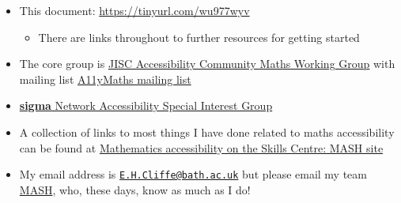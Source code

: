 \documentclass[
  10pt,
  a4paper]{article}
\providecommand{\tightlist}{%
  \setlength{\itemsep}{0pt}\setlength{\parskip}{0pt}}
\theoremstyle{plain}
\theoremstyle{plain}
\theoremstyle{plain}
\theoremstyle{plain}
\theoremstyle{plain}
\theoremstyle{definition}
\theoremstyle{definition}
\theoremstyle{definition}
\theoremstyle{remark}
\begin{document}
\begin{itemize}
\tightlist
\item
  This document: \url{https://tinyurl.com/wu977wyv}

  \begin{itemize}
  \tightlist
  \item
    There are links throughout to further resources for getting started
  \end{itemize}
\item
  The core group is \href{https://github.com/A11yMaths}{JISC Accessibility Community Maths Working Group} with mailing list \href{https://www.jiscmail.ac.uk/cgi-bin/webadmin?A0=ACCESSIBLE-MATHS}{A11yMaths mailing list}
\item
  \href{http://www.sigma-network.ac.uk/sigs/accessibility-sig/}{\textbf{sigma} Network Accessibility Special Interest Group}
\item
  A collection of links to most things I have done related to maths accessibility can be found at \href{https://www.bath.ac.uk/projects/mathematics-accessibility/}{Mathematics accessibility on the Skills Centre: MASH site}
\item
  My email address is \href{mailto:E.H.Cliffe@bath.ac.uk}{\nolinkurl{E.H.Cliffe@bath.ac.uk}} but please email my team \href{mailto:mash@bath.ac.uk}{MASH}, who, these days, know as much as I do!
\end{itemize}
\end{document}
